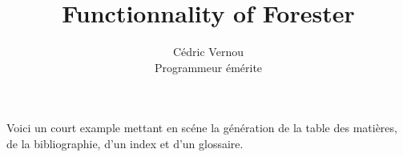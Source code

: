 \documentclass[11pt]{article}
\begin{document}
\title{Functionnality of Forester}
\author{Cédric Vernou\\
Programmeur émérite}

\maketitle
\tableofcontents
\newpage

Voici un court example mettant en scéne la génération de la table des matières, de la bibliographie, d'un index et d'un glossaire\cite{ARTMCCDDS}.





\printglossaries



\end{document}
